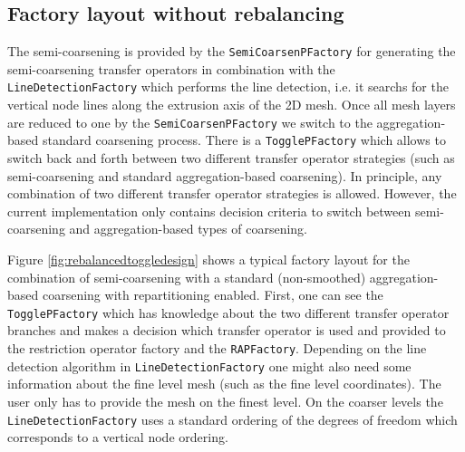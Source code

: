 \documentclass[10pt,fleqn]{book}
\begin{document}
\subsection{Factory layout without rebalancing}

The semi-coarsening is provided by the \texttt{SemiCoarsenPFactory} for generating the semi-coarsening transfer operators in combination with the \texttt{LineDetectionFactory} which performs the line detection, i.e. it searchs for the vertical node lines along the extrusion axis of the 2D mesh.
Once all mesh layers are reduced to one by the \texttt{SemiCoarsenPFactory} we switch to the aggregation-based standard coarsening process. There is a \texttt{TogglePFactory} which allows to switch back and forth between two different transfer operator strategies (such as semi-coarsening and standard aggregation-based coarsening). In principle, any combination of two different transfer operator strategies is allowed. However, the current implementation only contains decision criteria to switch between semi-coarsening and aggregation-based types of coarsening.

Figure \ref{fig:rebalancedtoggledesign} shows a typical factory layout for the combination of semi-coarsening with a standard (non-smoothed) aggregation-based coarsening with repartitioning enabled. First, one can see the \texttt{TogglePFactory} which has knowledge about the two different transfer operator branches and makes a decision which transfer operator is used and provided to the restriction operator factory and the \texttt{RAPFactory}. Depending on the line detection algorithm in \texttt{LineDetectionFactory} one might also need some information about the fine level mesh (such as the fine level coordinates). The user only has to provide the mesh on the finest level. On the coarser levels the \texttt{LineDetectionFactory} uses a standard ordering of the degrees of freedom which corresponds to a vertical node ordering.
\end{document}
